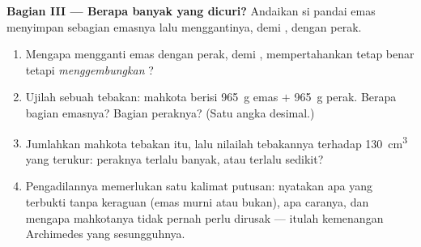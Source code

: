 \begin{problem}
\medskip\noindent\textbf{Bagian III --- Berapa banyak yang dicuri?}
Andaikan si pandai emas menyimpan sebagian emasnya lalu menggantinya,
 demi , dengan perak.
\begin{enumerate}[resume]
  \item Mengapa mengganti emas dengan perak,  demi ,
        mempertahankan  tetap benar tetapi
        \emph{menggembungkan} ?
  \item Ujilah sebuah tebakan: mahkota berisi \qty{965}{g} emas $+$
        \qty{965}{g} perak. Berapa  bagian emasnya? Bagian
        peraknya? (Satu angka desimal.)
  \item Jumlahkan  mahkota tebakan itu, lalu nilailah
        tebakannya terhadap \qty{130}{cm^3} yang terukur: peraknya
        terlalu banyak, atau terlalu sedikit?
  \item Pengadilannya memerlukan satu kalimat putusan: nyatakan apa
        yang terbukti tanpa keraguan (emas murni atau bukan), apa
        caranya, dan mengapa mahkotanya tidak pernah perlu dirusak
        --- itulah kemenangan Archimedes yang sesungguhnya.
\end{enumerate}
\end{problem}
